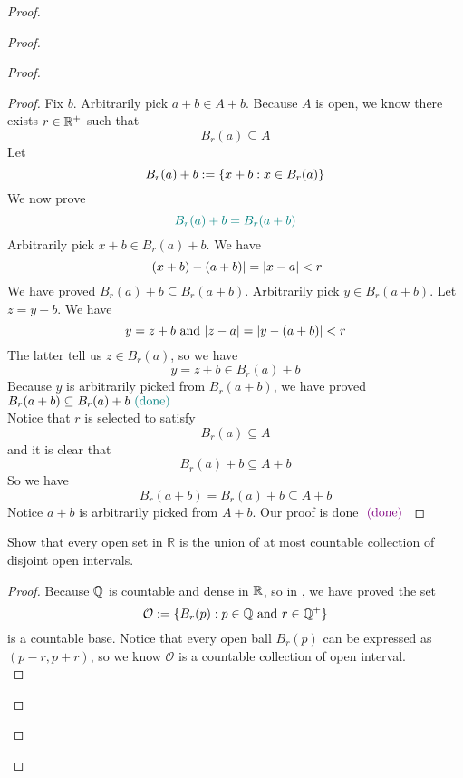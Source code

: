 \documentclass{report}
\begin{document}
\begin{proof}
\begin{proof}
\begin{proof}
\begin{proof}
Fix $b$. Arbitrarily pick $a+b\in A+b$. Because $A$ is open, we know there exists $r\in\mathbb{R}^+$ such that
\begin{equation}
B_r(a)\subseteq A
\end{equation}
Let
\begin{equation}
B_r(a)+b:=\{ x+b:x\in B_r(a) \}
\end{equation}
We now prove 
\begin{equation}
\textcolor{teal}{B_r(a)+b=B_r(a+b)}
\end{equation}
Arbitrarily pick $x+b\in B_r(a)+b$. We have
\begin{equation}
|(x+b)-(a+b)|=|x-a|<r
\end{equation}
We have proved $B_r(a)+b\subseteq B_r(a+b)$. Arbitrarily pick $y\in B_r(a+b)$. Let $z=y-b$. We have
\begin{equation}
y=z+b\text{ and }|z-a|=|y-(a+b)|<r
\end{equation}
The latter tell us $z \in B_r(a)$, so we have
\begin{equation}
y=z+b \in B_r(a)+b
\end{equation}
Because $y$ is arbitrarily picked from $B_r(a+b)$, we have proved $B_r(a+b)\subseteq B_r(a)+b\textcolor{teal}{\text{ (done) }}$\\

Notice that  $r$ is selected to satisfy
\begin{equation}
B_r(a)\subseteq A
\end{equation}
and it is clear that
\begin{equation}
B_r(a)+b\subseteq A+b
\end{equation}
So we have
\begin{equation}
B_r(a+b)=B_r(a)+b\subseteq A+b
\end{equation}
Notice $a+b$ is arbitrarily picked from $A+b$. Our proof is done  $\textcolor{violet}{\text{ (done) }}$
\end{proof}

\begin{question}{}{}
Show that every open set in \( \mathbb{R} \) is the union of at most countable collection of disjoint open intervals.
\end{question}
\begin{proof}
Because $\mathbb{Q}$ is countable and dense in  $\mathbb{R}$, so in , we have proved the set
\begin{equation}
\mathcal{O}:=\{ B_r(p):p\in\mathbb{Q}\text{ and }r\in\mathbb{Q}^+ \}
\end{equation}
is a countable base. Notice that every open ball $B_r(p)$ can be expressed as $(p-r,p+r)$, so we know $\mathcal{O}$ is a countable collection of open interval.\\


\end{proof}
\end{proof}
\end{proof}
\end{proof}
\end{document}
